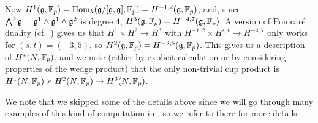 Now $H^1(\mathfrak{g},\mathbb{F}_p) = \operatorname{Hom}_k(\mathfrak{g}/[\mathfrak{g},\mathfrak{g}],\mathbb{F}_p) = H^{-1,2}(\mathfrak{g},\mathbb{F}_p)$, and, since $\bigwedge^3 \mathfrak{g} = \mathfrak{g}^1 \wedge \mathfrak{g}^1 \wedge \mathfrak{g}^2$ is degree $4$, $H^3(\mathfrak{g},\mathbb{F}_p) = H^{-4,7}(\mathfrak{g},\mathbb{F}_p)$. A version of Poincaré duality (cf.\ \cite[Chap.~1~§3.6--7]{Fuks}) gives us that $H^1 \times H^2 \to H^3$ with $H^{-1,2} \times H^{s,t} \to H^{-4,7}$ only works for $(s,t) = (-3,5)$, so $H^2(\mathfrak{g},\mathbb{F}_p) = H^{-3,5}(\mathfrak{g},\mathbb{F}_p)$. This gives us a description of $H^*(N,\mathbb{F}_p)$, and we note (either by explicit calculation or by considering properties of the wedge product) that the only non-trivial cup product is $H^1(N,\mathbb{F}_p) \times H^2(N,\mathbb{F}_p) \to H^3(N,\mathbb{F}_p)$.

We note that we skipped some of the details above since we will go through many examples of this kind of computation in , so we refer to there for more details.


